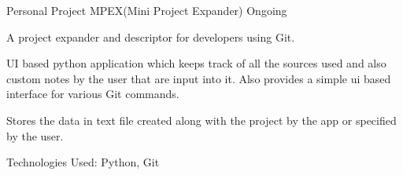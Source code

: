 \begin{cventries}

 \cventry
    {Personal Project} %
    {MPEX(Mini Project Expander)} %
    {} %
    {Ongoing} %
    {
      \begin{cvitems} %
        \item {A project expander and descriptor for developers using Git.}
        \item {UI based python application which keeps track of all the sources used and also custom notes by the user that are input into it. Also provides a simple ui based interface for various Git commands.}
        \item {Stores the data in text file created along with the project by the app or specified by the user.}
        \item {Technologies Used: Python, Git}
      \end{cvitems}
    }

\end{cventries}
